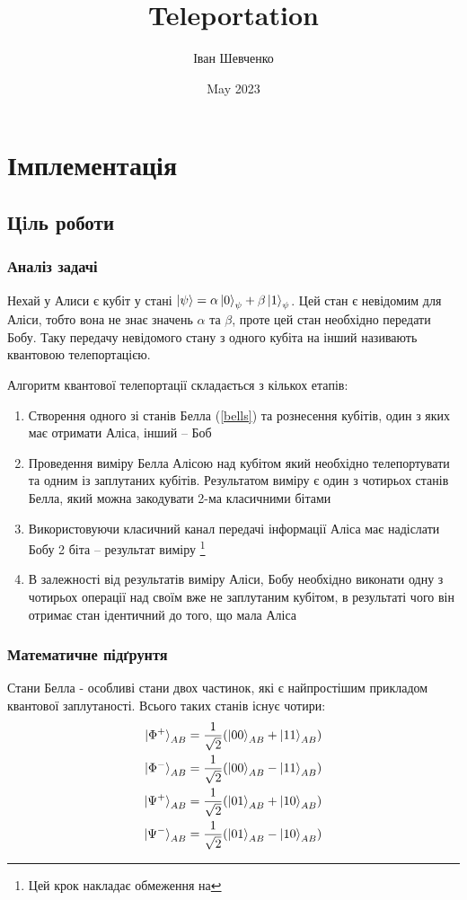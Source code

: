 \documentclass{article}
\title{Teleportation}
\author{Іван Шевченко}
\date{May 2023}
\begin{document}
\tableofcontents
\pagebreak

\section{Імплементація}
\subsection{Цiль роботи}
\subsubsection{Аналіз задачі}


Нехай у Алиси є кубіт у стані $\ket{\psi} = \alpha\ket{0}_\psi + \beta\ket{1}_\psi$. Цей стан є невідомим для Аліси, тобто вона не знає значень $\alpha$ та $\beta$, проте цей стан необхідно передати Бобу. Таку передачу невідомого стану з одного кубіта на інший називають квантовою телепортацією.

Алгоритм квантової телепортації складається з кількох етапів:
\begin{enumerate}
 \item Створення одного зі станів Белла (\ref{bells}) та рознесення кубітів, один з яких має отримати Аліса, інший -- Боб
 \item Проведення виміру Белла Алісою над кубітом який необхідно телепортувати та одним із заплутаних кубітів. Результатом виміру є один з чотирьох станів Белла, який можна закодувати 2-ма класичними бітами
 \item Використовуючи класичний канал передачі інформації Аліса має надіслати Бобу 2 біта -- результат виміру \footnote{Цей крок накладає обмеження на }
 \item В залежності від результатів виміру Аліси, Бобу необхідно виконати одну з чотирьох операції над своїм вже не заплутаним кубітом, в результаті чого він отримає стан ідентичний до того, що мала Аліса
\end{enumerate}

\subsubsection{Математичне підґрунтя}

Стани Белла - особливі стани двох частинок, які є найпростішим прикладом квантової заплутаності. Всього таких станів існує чотири:
\begin{align}
\begin{split}
\ket{\Phi^+}_{AB} = \frac{1}{\sqrt{2}}(\ket{00}_{AB} + \ket{11}_{AB}) \\
\ket{\Phi^-}_{AB} = \frac{1}{\sqrt{2}}(\ket{00}_{AB} - \ket{11}_{AB}) \\
\ket{\Psi^+}_{AB} = \frac{1}{\sqrt{2}}(\ket{01}_{AB} + \ket{10}_{AB}) \\
\ket{\Psi^-}_{AB} = \frac{1}{\sqrt{2}}(\ket{01}_{AB} - \ket{10}_{AB})
\end{split}
\label{bells}
\end{align}
\end{document}
